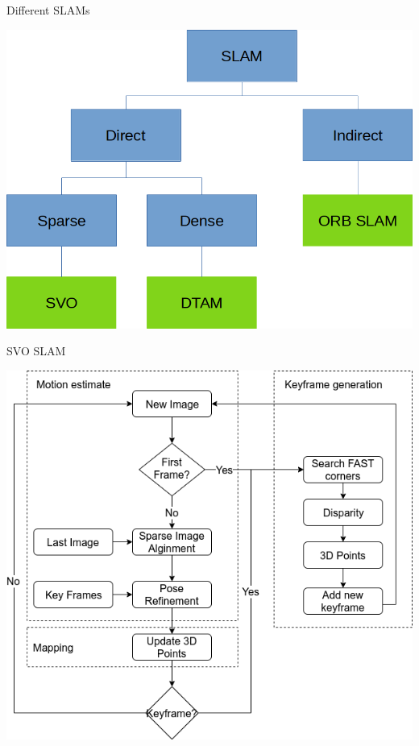 \documentclass[aspectratio=169]{beamer}
\begin{document}
\begin{frame}{Different SLAMs}
  \begin{center}
    \includegraphics[height=0.9\textheight]{../img/slam_modes.png}
  \end{center}
\end{frame}

\begin{frame}{SVO SLAM}
  \begin{center}
    \includegraphics[height=0.9\textheight]{../img/our_svo_slam.png}
  \end{center}
\end{frame}
\end{document}
